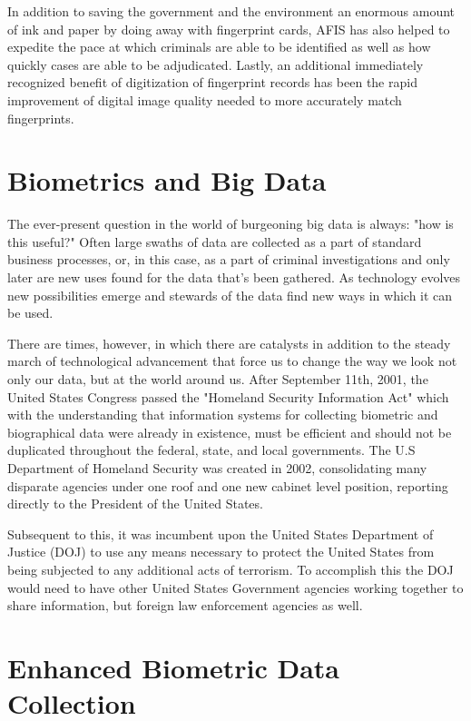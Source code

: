 \documentclass[sigconf]{acmart}
\begin{document}
In addition to saving the government and the environment an enormous amount of ink and paper by doing away with fingerprint cards, AFIS has also helped to expedite the pace at which criminals are able to be identified as well as how quickly cases are able to be adjudicated. Lastly, an additional immediately recognized benefit of digitization of fingerprint records has been the rapid improvement of digital image quality needed to more accurately match fingerprints. 

\section{Biometrics and Big Data}

The ever-present question in the world of burgeoning big data is always: "how is this useful?" Often large swaths of data are collected as a part of standard business processes, or, in this case, as a part of criminal investigations and only later are new uses found for the data that's been gathered. As technology evolves new possibilities emerge and stewards of the data find new ways in which it can be used.  

There are times, however, in which there are catalysts in addition to the steady march of technological advancement that force us to change the way we look not only our data, but at the world around us. After September 11th, 2001, the United States Congress passed the "Homeland Security Information Act" which with the understanding that information systems for collecting biometric and biographical data were already in existence, must be efficient and should not be duplicated throughout the federal, state, and local governments. The U.S Department of Homeland Security was created in 2002, consolidating many disparate agencies under one roof and one new cabinet level position, reporting directly to the President of the United States.

Subsequent to this, it was incumbent upon the United States Department of Justice (DOJ) to use any means necessary to protect the United States from being subjected to any additional acts of terrorism. To accomplish this the DOJ would need to have other United States Government agencies working together to share information, but foreign law enforcement agencies as well. 

\section{Enhanced Biometric Data Collection}
\end{document}
